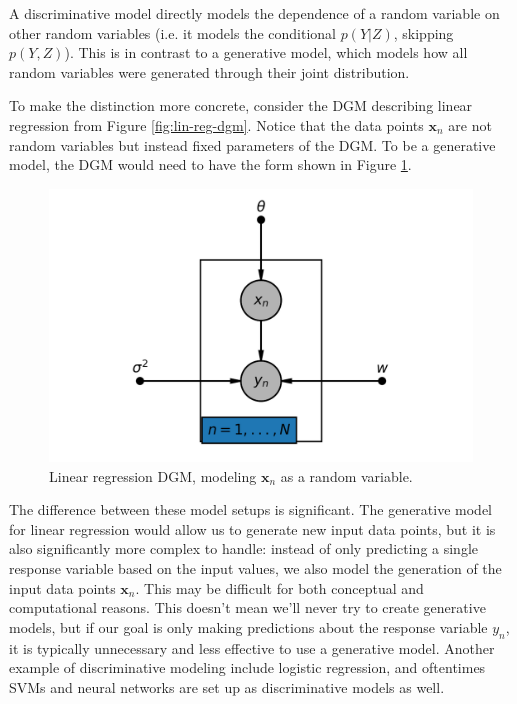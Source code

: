 A discriminative model directly models the dependence of a random variable on other random variables (i.e. it models the conditional $p(Y|Z)$, skipping $p(Y,Z)$). This is in contrast to a generative model, which models how all random variables were generated through their joint distribution.

To make the distinction more concrete, consider the DGM describing linear regression from Figure \ref{fig:lin-reg-dgm}. Notice that the data points $\textbf{x}_n$ are not random variables but instead fixed parameters of the DGM. To be a generative model, the DGM would need to have the form shown in Figure \ref{fig:lin-reg-model-x}.
\begin{figure}
	\centering
	\includegraphics[width=0.5\paperwidth]{../GraphicalModels/fig/lin-reg-model-x.png}
    \caption{Linear regression DGM, modeling $\textbf{x}_n$ as a random variable.}
	\label{fig:lin-reg-model-x}
\end{figure}

The difference between these model setups is significant. The generative model for linear regression would allow us to generate new input data points, but it is also significantly more complex to handle: instead of only predicting a single response variable based on the input values, we also model the generation of the input data points $\textbf{x}_n$. This may be difficult for both conceptual and computational reasons. This doesn't mean we'll never try to create generative models, but if our goal is only making predictions about the response variable $y_n$, it is typically unnecessary and less effective to use a generative model. Another example  of discriminative modeling include logistic regression, and oftentimes SVMs and neural networks are set up as discriminative models as well. 

